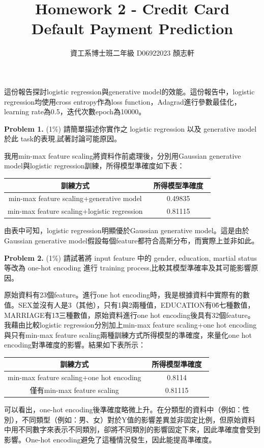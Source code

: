 \documentclass{article}
\title{Homework 2 - Credit Card\\ Default Payment Prediction}
\author{資工系博士班二年級 D06922023 顏志軒}
\begin{document}
\maketitle

這份報告探討logistic regression與generative model的效能。這份報告中，logistic regression均使用cross entropy作為loss function，Adagrad進行參數最佳化，learning rate為0.5，迭代次數epoch為10000。

\textbf{Problem 1.} (1\%) 請簡單描述你實作之 logistic regression 以及 generative model 於此 task的表現,試著討論可能原因。

我用min-max feature scaling將資料作前處理後，分別用Gaussian generative model與logistic regression訓練，所得模型準確度如下表：

\begin{tabular}{|c|c|}
	\hline
	訓練方式 & 所得模型準確度　\\
	\hline
	min-max feature scaling+generative model & 0.49835 \\
	\hline
	min-max feature scaling+logistic regression & 0.81115 \\
	\hline
\end{tabular}

由表中可知，logistic regression明顯優於Gaussian generative model。這是由於Gaussian generative model假設每個feature都符合高斯分布，而實際上並非如此。

\textbf{Problem 2.} (1\%) 請試著將 input feature 中的 gender, education, martial status 等改為 one-hot encoding 進行 training process,比較其模型準確率及其可能影響原因。

原始資料有23個feature。進行one hot encoding時，我是根據資料中實際有的數值。SEX並沒有人是3（其他），只有1與2兩種值，EDUCATION有0\~6七種數值，MARRIAGE有1\~3三種數值，原始資料進行one hot encoding後具有32個feature。我藉由比較logistic regression分別加上min-max feature scaling+one hot encoding與只有min-max feature scaling兩種訓練方式所得模型的準確度，來量化one hot encoding對準確度的影響。結果如下表所示：

\begin{tabular}{|c|c|}
	\hline
	訓練方式 & 所得模型準確度　\\
	\hline
	min-max feature scaling+one hot encoding & 0.8114 \\
	\hline
	僅有min-max feature scaling & 0.81115 \\
	\hline
\end{tabular}

可以看出，one-hot encoding後準確度略微上升。在分類型的資料中（例如：性別），不同類型（例如：男、女）對於Y值的影響差異並非固定比例，但原始資料中用不同數字來表示不同類別，卻將不同類別的影響固定下來，因此準確度會受到影響。One-hot encoding避免了這種情況發生，因此能提高準確度。
\end{document}
